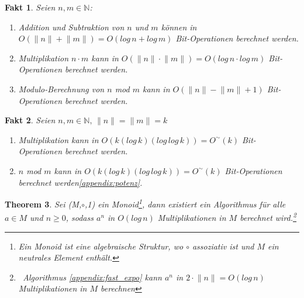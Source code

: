 \documentclass[12pt,oneside]{article}
\newtheorem{theorem}{Theorem}[section]
\newtheorem{fact}[theorem]{Fakt}
\theoremstyle{remark}
\theoremstyle{definition}
\begin{document}
\begin{fact}\label{fact_1}
Seien $n,m \in \mathbb{N}$:\newline
\begin{enumerate}
    \item Addition und Subtraktion von $n$ und $m$ können in $O(\lVert n \rVert + \lVert m \rVert) = O(log \, n + log \, m)$ Bit-Operationen berechnet werden.\newline
    \item Multiplikation $ n \cdot m$ kann in $O(\lVert n \rVert \cdot \lVert m \rVert) = O(log \, n \cdot log \, m)$ Bit-Operationen berechnet werden.\newline
    \item Modulo-Berechnung von $n$ mod $m$ kann in $O(\lVert n \rVert - \lVert m \rVert + 1)$ Bit-Operationen berechnet werden.\newline\newline
\end{enumerate}
\end{fact}

\begin{fact}\label{fact_2}
Seien $n,m \in \mathbb{N}, \, \lVert n \rVert = \lVert m \rVert =k$
\begin{enumerate}
    \item Multiplikation kann in $O(k (log \, k)(log \, log \, k)) = O^{\sim}(k)$ Bit-Operationen berechnet werden.\newline
    \item $n$ mod $m$ kann in $O(k (log \, k)(log \, log \, k)) = O^{\sim}(k)$ Bit-Operationen berechnet werden\ref{appendix:potenz}.\newline
\end{enumerate}
\end{fact}
\begin{theorem}\label{poly_mult}
Sei (M,$\circ$,1) ein Monoid\footnote{Ein Monoid ist eine algebraische Struktur, wo $\circ$ assoziativ ist und $M$ ein neutrales Element enthält\cite{monoid}. }, dann existiert ein Algorithmus für alle $a \in  M$ und $n \geq 0$, sodass $a^n$ in $O(log \, n)$ Multiplikationen in $M$ berechnet wird.\footnote{$\,$ Algorithmus \ref{appendix:fast_expo} kann $a^n$ in $2\cdot \lVert n \rVert = O(log \, n)$ Multiplikationen in $M$ berechnen}
\end{theorem}


\newpage

\end{document}
